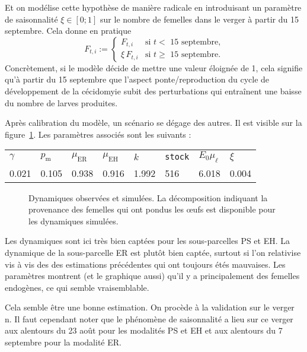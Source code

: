 Et on modélise cette hypothèse de manière radicale en introduisant un paramètre de saisonnalité $\xi \in [0;1]$ sur le nombre de femelles dans le verger à partir du 15 septembre.
Cela donne en pratique
\[
F_{t,i} := \begin{cases}
            F_{t, i} & \text{si $t<$ 15 septembre,}\\
            \xi \, F_{t, i} & \text{si $t\geq$ 15 septembre.}
           \end{cases}
\]
Concrètement, si le modèle décide de mettre une valeur éloignée de 1, cela signifie qu'à partir du 15 septembre que l'aspect ponte/reproduction du cycle de développement de la cécidomyie subit des perturbations qui entraînent une baisse du nombre de larves produites.

Après calibration du modèle, un scénario se dégage des autres.
Il est visible sur la figure~\ref{fig:D}.
Les paramètres associés sont les suivants :
\begin{center}
\begin{tabular}{llllllll}
$\gamma$ & $p_{\text{m}}$ & $\mu_{\text{ER}}$ & $\mu_{\text{EH}}$ & $k$ & \texttt{stock} & $E_0\mu_{\ell}$ & $\xi$\\
0.021 & 0.105 & 0.938 & 0.916 & 1.992 & 516 & 6.018 & 0.004
\end{tabular}
\end{center}


\begin{figure}[ht]
 \centering
 \caption{Dynamiques observées et simulées. La décomposition indiquant la provenance des femelles qui ont pondus les œufs est disponible pour les dynamiques simulées.}
 \label{fig:D}
\end{figure}


Les dynamiques sont ici très bien captées pour les sous-parcelles PS et EH.
La dynamique de la sous-parcelle ER est plutôt bien captée, surtout si l'on relativise vis à vis des des estimations précédentes qui ont toujours étés mauvaises.
Les paramètres montrent (et le graphique aussi) qu'il y a principalement des femelles endogènes, ce qui semble vraisemblable.



Cela semble être une bonne estimation.
On procède à la validation sur le verger n.
Il faut cependant noter que le phénomène de saisonnalité a lieu sur ce verger aux alentours du 23 août pour les modalités PS et EH et aux alentours du 7 septembre pour la modalité ER.

